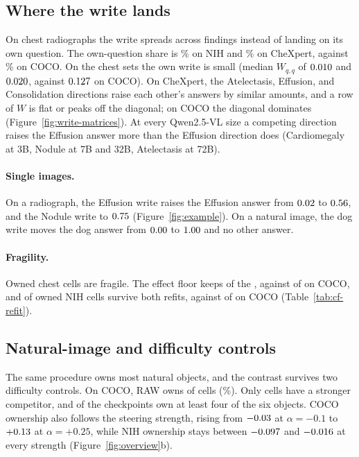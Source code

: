\subsection{Where the write lands}
\label{sec:deficit}

On chest radiographs the write spreads across findings instead of landing on its own question. The own-question share is \cfOwnShareNih\% on NIH and \cfOwnShareChex\% on CheXpert, against \cfOwnShareCoco\% on COCO. On the chest sets the own write is small (median $W_{q,q}$ of $0.010$ and $0.020$, against $0.127$ on COCO). On CheXpert, the Atelectasis, Effusion, and Consolidation directions raise each other's answers by similar amounts, and a row of $W$ is flat or peaks off the diagonal; on COCO the diagonal dominates (Figure~\ref{fig:write-matrices}). At every Qwen2.5-VL size a competing direction raises the Effusion answer more than the Effusion direction does (Cardiomegaly at 3B, Nodule at 7B and 32B, Atelectasis at 72B).

\paragraph{Single images.} On a radiograph, the Effusion write raises the Effusion answer from $0.02$ to $0.56$, and the Nodule write to $0.75$ (Figure~\ref{fig:example}). On a natural image, the dog write moves the dog answer from $0.00$ to $1.00$ and no other answer.

\paragraph{Fragility.} Owned chest cells are fragile. The effect floor keeps \cfChestFloored{} of the \cfChestOwned{}, against \cfCocoFloored{} of \cfCocoOwned{} on COCO, and \cfRefitGradeStableNih{} of \cfRefitGradeOwnedNih{} owned NIH cells survive both refits, against \cfRefitGradeStableCoco{} of \cfRefitGradeOwnedCoco{} on COCO (Table~\ref{tab:cf-refit}).

\subsection{Natural-image and difficulty controls}
\label{sec:coco}

The same procedure owns most natural objects, and the contrast survives two difficulty controls. On COCO, RAW owns \cfCocoOwned{} of \cfCocoOwnedN{} cells (\cfCocoOwnedPct\%). Only \cfCocoCompetitor{} cells have a stronger competitor, and \cfCocoBlocksFourPlus{} of the \cfCocoBlocks{} checkpoints own at least four of the six objects. COCO ownership also follows the steering strength, rising from $-0.03$ at $\alpha=-0.1$ to $+0.13$ at $\alpha=+0.25$, while NIH ownership stays between $-0.097$ and $-0.016$ at every strength (Figure~\ref{fig:overview}b).

